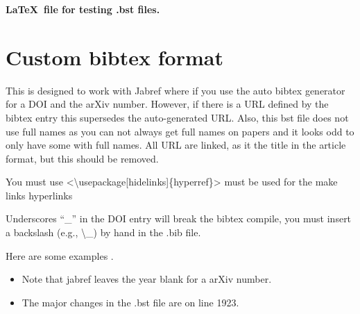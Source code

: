 \documentclass[11pt,letterpaper]{article}
\begin{document}
\begin{center}{\Large 
	\textbf{\LaTeX\ file for testing .bst files.}}
\end{center}





	
		
		
		
	\section{Custom bibtex format}		

	This is designed to work with Jabref where if you use the auto bibtex generator for a DOI and the arXiv number. However, if there is a URL defined by the bibtex entry this supersedes the auto-generated URL. Also, this bst file does not use full names as you can not always get full names on papers and it looks odd to only have some with full names. All URL are linked, as it the title in the article format, but this should be removed. 
	
	
	You must use <\textbackslash usepackage[hidelinks]\{hyperref\}> must be used for the make links hyperlinks
	
	Underscores ``\_'' in the DOI entry will break the bibtex compile, you must insert a backslash (e.g., \textbackslash \_) by hand in the .bib file. 
	
	
	
	
	
	
	Here are some examples \cite{test1,test2,test3,test4,test5,test6,test7,test8,test9}.	
	
	\begin{itemize}
	\item Note that jabref leaves the year blank for a arXiv number. 
	\item The major changes in the .bst file are on line 1923.
	\end{itemize}
	
	
	
	



			
\pagestyle{empty}
	\FloatBarrier
	\renewcommand{\thepage}{}
	\renewcommand\refname{References Cited}
	
\end{document}

